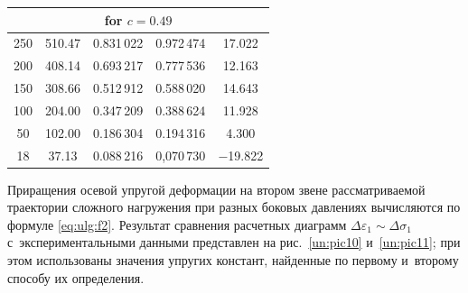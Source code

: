 \begin{table}[h!]
\begin{tabular}{c|c|c|c|c}
\multicolumn{5}{c}{\rule{0mm}{12pt}\footnotesize for $c=0.49$}\\

\hline

            \rule{0mm}{12pt}%

            250 &510.47& 0.831\,022 & 0.972\,474 & \phantom{$-$}17.022 \\

             200 & 408.14& 0.693\,217 & 0.777\,536 & \phantom{$-$}12.163 \\

             150 & 308.66& 0.512\,912 & 0.588\,020 & \phantom{$-$}14.643 \\

	    100 & 204.00& 0.347\,209 & 0.388\,624 & \phantom{$-$}11.928 \\

            \phantom{1}50 & 102.00& 0.186\,304 & 0.194\,316 & \phantom{$-1$}4.300 \\

             \phantom{1}18 & \phantom{1}37.13& 0.088\,216 &0,070\,730 & $-$19.822\\

            \hline

        \end{tabular}



\end{table} 




Приращения осевой упругой деформации на втором звене рассматриваемой траектории сложного нагружения при разных боковых давлениях вычисляются по формуле \eqref{eq:ulg:f2}. Результат сравнения расчетных диаграмм $\Delta\varepsilon_1\sim \Delta\sigma_1$ с~экспериментальными данными представлен на рис.~\ref{un:pic10} и~\ref{un:pic11}; при этом  использованы значения упругих констант, найденные по первому и~второму способу их определения. 







